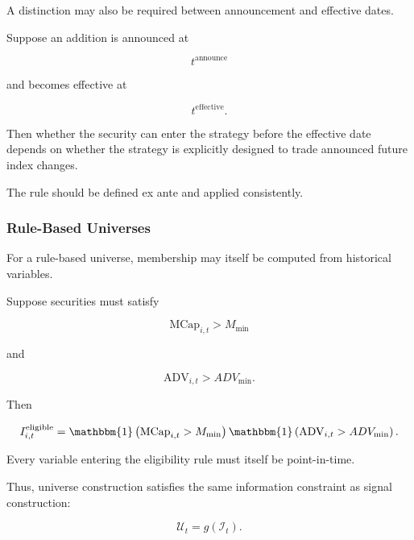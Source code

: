 \documentclass[11pt,a4paper]{article}
\begin{document}
A distinction may also be required between announcement and effective dates.

Suppose an addition is announced at

\begin{equation}
t^{\mathrm{announce}}
\end{equation}

and becomes effective at

\begin{equation}
t^{\mathrm{effective}}.
\end{equation}

Then whether the security can enter the strategy before the effective date
depends on whether the strategy is explicitly designed to trade announced
future index changes.

The rule should be defined ex ante and applied consistently.


\subsubsection{Rule-Based Universes}

For a rule-based universe, membership may itself be computed from historical
variables.

Suppose securities must satisfy

\begin{equation}
\mathrm{MCap}_{i,t}
>
M_{\min}
\end{equation}

and

\begin{equation}
\mathrm{ADV}_{i,t}
>
ADV_{\min}.
\end{equation}

Then

\begin{equation}
I_{i,t}^{\mathrm{eligible}}
=
\mathbbm{1}
\left(
\mathrm{MCap}_{i,t}>M_{\min}
\right)
\mathbbm{1}
\left(
\mathrm{ADV}_{i,t}>ADV_{\min}
\right).
\end{equation}

Every variable entering the eligibility rule must itself be point-in-time.

Thus, universe construction satisfies the same information constraint as signal
construction:

\begin{equation}
\boxed{
\mathcal{U}_t
=
g(\mathcal{I}_t).
}
\end{equation}


\end{document}
